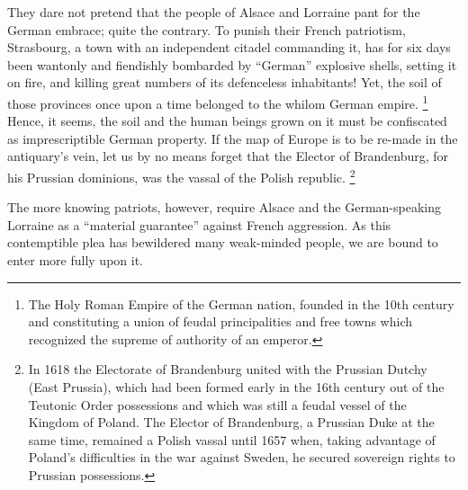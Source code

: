 \documentclass{book}
\begin{document}
They dare not pretend that the people of Alsace and Lorraine pant for the
German embrace; quite the contrary. To punish their French patriotism,
Strasbourg, a town with an independent citadel commanding it, has for six
days been wantonly and fiendishly bombarded by “German” explosive shells,
setting it on fire, and killing great numbers of its defenceless
inhabitants! Yet, the soil of those provinces once upon a time belonged to
the whilom German empire. \footnote{The Holy Roman Empire of the German
nation, founded in the 10th century and constituting a union of feudal
principalities and free towns which recognized the supreme of authority of
an emperor.} Hence, it seems, the soil and the human beings grown on it
must be confiscated as imprescriptible German property. If the map of
Europe is to be re-made in the antiquary’s vein, let us by no means forget
that the Elector of Brandenburg, for his Prussian dominions, was the
vassal of the Polish republic. \footnote{In 1618 the Electorate of
Brandenburg united with the Prussian Dutchy (East Prussia), which had been
formed early in the 16th century out of the Teutonic Order possessions and
which was still a feudal vessel of the Kingdom of Poland. The Elector of
Brandenburg, a Prussian Duke at the same time, remained a Polish vassal
until 1657 when, taking advantage of Poland’s difficulties in the war
against Sweden, he secured sovereign rights to Prussian possessions.}


The more knowing patriots, however, require Alsace and the German-speaking
Lorraine as a “material guarantee” against French aggression. As this
contemptible plea has bewildered many weak-minded people, we are bound to
enter more fully upon it.
\end{document}
